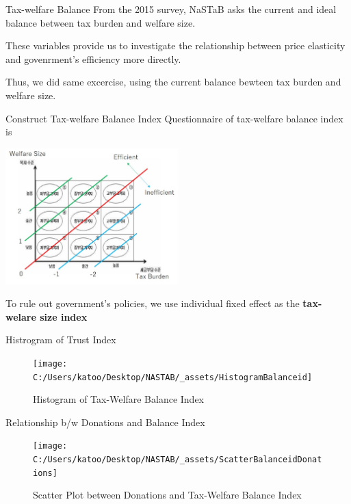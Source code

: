 \documentclass[
  ignorenonframetext,
]{beamer}
\begin{document}
\begin{frame}{Tax-welfare Balance}
\protect\hypertarget{tax-welfare-balance}{}
From the 2015 survey,
NaSTaB asks the current and ideal balance between tax burden and welfare size.

These variables provide us to investigate the relationship between price elasticity and govenrment's efficiency
more directly.

Thus, we did same excercise, using the current balance bewteen tax burden and welfare size.
\end{frame}

\begin{frame}{Construct Tax-welfare Balance Index}
\protect\hypertarget{construct-tax-welfare-balance-index}{}
Questionnaire of tax-welfare balance index is

\includegraphics[width=0.5\textwidth,height=\textheight]{_assets/BalanceQuestion.jpg}

To rule out government's policies, we use individual fixed effect as the \textbf{tax-welare size index}
\end{frame}

\begin{frame}{Histrogram of Trust Index}
\protect\hypertarget{histrogram-of-trust-index-1}{}
\begin{figure}
\texttt{[image: C:/Users/katoo/Desktop/NASTAB/\_assets/HistogramBalanceid]} \caption{Histogram of Tax-Welfare Balance Index}\label{fig:unnamed-chunk-8}
\end{figure}
\end{frame}

\begin{frame}{Relationship b/w Donations and Balance Index}
\protect\hypertarget{relationship-bw-donations-and-balance-index}{}
\begin{figure}
\texttt{[image: C:/Users/katoo/Desktop/NASTAB/\_assets/ScatterBalanceidDonations]} \caption{Scatter Plot between Donations and Tax-Welfare Balance Index}\label{fig:unnamed-chunk-9}
\end{figure}
\end{frame}
\end{document}
